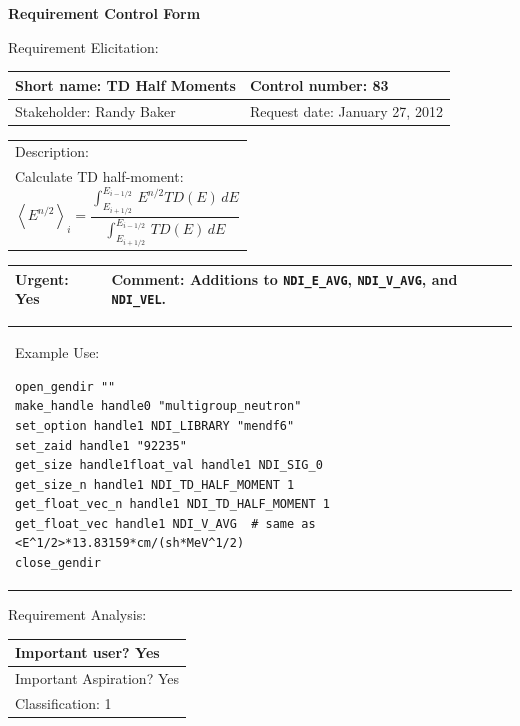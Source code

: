 \begin{center}\Large\bf
Requirement Control Form
\end{center}
\vspace{24pt}

Requirement Elicitation:

\begin{tabular}{|p{211pt}|p{211pt}|} \hline
Short name: TD Half Moments & Control number: 83\\ \hline
Stakeholder: Randy Baker & Request date: January 27, 2012\\
\end{tabular}
\begin{tabular}{|p{433pt}|} \hline
Description: \\ 
Calculate TD half-moment:
\begin{displaymath}
\left<E^{n/2}\right>_i = \frac{\int_{E_{i+1/2}}^{E_{i-1/2}}\, E^{n/2}
  TD(E)\,dE}{\int_{E_{i+1/2}}^{E_{i-1/2}}\, TD(E)\,dE} 
\end{displaymath}\\
\hline
\end{tabular} 
\begin{tabular}{|p{211pt}|p{211pt}|} \hline
Urgent: Yes & Comment: Additions to \texttt{NDI\_E\_AVG},
\texttt{NDI\_V\_AVG}, and \texttt{NDI\_VEL}. \\ \hline
\end{tabular}

\vspace{12pt} 
\begin{tabular}{|p{433pt}|} \hline
Example Use: 
\begin{verbatim}
open_gendir ""
make_handle handle0 "multigroup_neutron"
set_option handle1 NDI_LIBRARY "mendf6"
set_zaid handle1 "92235"
get_size handle1float_val handle1 NDI_SIG_0
get_size_n handle1 NDI_TD_HALF_MOMENT 1
get_float_vec_n handle1 NDI_TD_HALF_MOMENT 1
get_float_vec handle1 NDI_V_AVG	 # same as <E^1/2>*13.83159*cm/(sh*MeV^1/2)
close_gendir
\end{verbatim}
\end{tabular}

\vspace{24pt}

Requirement Analysis:

\begin{tabular}{|p{433pt}|} \hline
Important user? Yes \\ \hline
Important Aspiration? Yes \\ \hline
Classification: 1 \\ \hline
\end{tabular}
\vspace{24pt}

